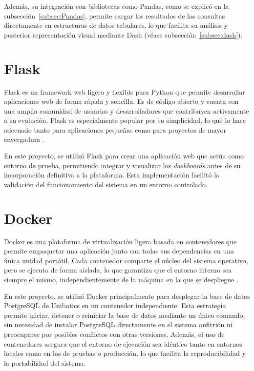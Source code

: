 \documentclass[a4paper, 12pt]{book}
\begin{document}
Además, su integración con bibliotecas como Pandas, como se explicó en la subsección~\ref{subsec:Pandas}, permite cargar los resultados de las consultas directamente en estructuras de datos tabulares, lo que facilita su análisis y posterior representación visual mediante Dash (véase subsección~\ref{subsec:dash}).



\section{Flask}
\label{sec:Flask}

Flask es un framework web ligero y flexible para Python que permite desarrollar aplicaciones web de forma rápida y sencilla. Es de código abierto y cuenta con una amplia comunidad de usuarios y desarrolladores que contribuyen activamente a su evolución. Flask es especialmente popular por su simplicidad, lo que lo hace adecuado tanto para aplicaciones pequeñas como para proyectos de mayor envergadura \cite{grinbergflask}.

En este proyecto, se utilizó Flask para crear una aplicación web que actúa como entorno de prueba, permitiendo integrar y visualizar los \textit{dashboards} antes de su incorporación definitiva a la plataforma. Esta implementación facilitó la validación del funcionamiento del sistema en un entorno controlado.



\section{Docker}
\label{sec:Docker}

Docker es una plataforma de virtualización ligera basada en contenedores que permite empaquetar una aplicación junto con todas sus dependencias en una única unidad portátil. Cada contenedor comparte el núcleo del sistema operativo, pero se ejecuta de forma aislada, lo que garantiza que el entorno interno sea siempre el mismo, independientemente de la máquina en la que se despliegue \cite{nickoloff2019docker}.

En este proyecto, se utilizó Docker principalmente para desplegar la base de datos PostgreSQL de Unibotics en un contenedor independiente. Esta estrategia permite iniciar, detener o reiniciar la base de datos mediante un único comando, sin necesidad de instalar PostgreSQL directamente en el sistema anfitrión ni preocuparse por posibles conflictos con otras versiones. Además, el uso de contenedores asegura que el entorno de ejecución sea idéntico tanto en entornos locales como en los de pruebas o producción, lo que facilita la reproducibilidad y la portabilidad del sistema.
\end{document}

